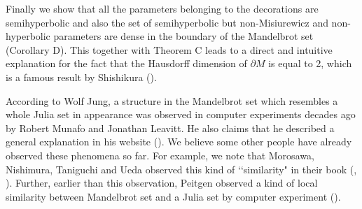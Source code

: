 Finally we show that all 
the parameters belonging to the decorations are semihyperbolic and also the 
set of semihyperbolic but non-Misiurewicz and non-hyperbolic parameters are 
dense in the boundary
of the Mandelbrot set (Corollary D). This together with Theorem C leads to a 
direct and intuitive explanation for the fact that the Hausdorff dimension 
of $\partial M$ is equal to 2, which is a famous result by 
Shishikura (\cite{Shishikura 1998}).




According to Wolf Jung, a structure in the Mandelbrot set which resembles a
whole Julia set in appearance was observed in
computer experiments decades ago by Robert Munafo and Jonathan Leavitt. 
He also claims that he described a general explanation in his
website (\cite{Jung 2015}). We believe some other people  have already 
observed these phenomena so far. For example, we note that Morosawa, 
Nishimura, Taniguchi and Ueda observed this kind of \lq\lq similarity" 
in their book (\cite[p.19]{MTU 1995}, \cite[p.26]{MNTU 2000}). Further, 
earlier than this observation, Peitgen observed a kind of local 
similarity between Mandelbrot set and a Julia set by computer experiment 
(\cite[Figure 4.23]{Peitgen-Saupe 1988}). 










